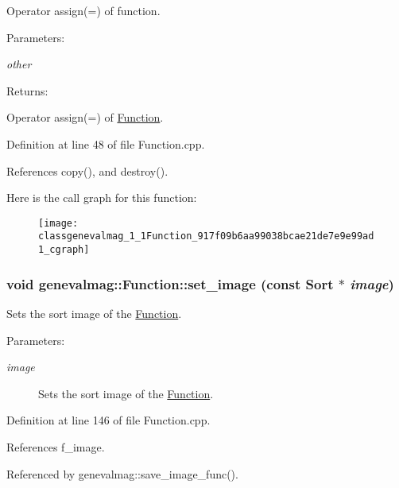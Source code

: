 Operator assign(=) of function. \begin{Desc}
\item[Parameters:]
\begin{description}
\item[{\em other}]\end{description}
\end{Desc}
\begin{Desc}
\item[Returns:]\end{Desc}
Operator assign(=) of \hyperlink{classgenevalmag_1_1Function}{Function}. 

Definition at line 48 of file Function.cpp.

References copy(), and destroy().

Here is the call graph for this function:\nopagebreak
\begin{figure}[H]
\begin{center}
\leavevmode
\texttt{[image: classgenevalmag\_1\_1Function\_917f09b6aa99038bcae21de7e9e99ad1\_cgraph]}
\end{center}
\end{figure}
\hypertarget{classgenevalmag_1_1Function_b82067b5dfd6d143a12defbf6eb52d56}{
\subsubsection[{set\_\-image}]{\setlength{\rightskip}{0pt plus 5cm}void genevalmag::Function::set\_\-image (const {\bf Sort} $\ast$ {\em image})}}
\label{classgenevalmag_1_1Function_b82067b5dfd6d143a12defbf6eb52d56}


Sets the sort image of the \hyperlink{classgenevalmag_1_1Function}{Function}. \begin{Desc}
\item[Parameters:]
\begin{description}
\item[{\em image}]Sets the sort image of the \hyperlink{classgenevalmag_1_1Function}{Function}. \end{description}
\end{Desc}


Definition at line 146 of file Function.cpp.

References f\_\-image.

Referenced by genevalmag::save\_\-image\_\-func().


